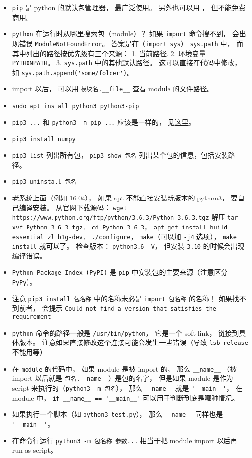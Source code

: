 

\begin{itemize}
\item \verb`pip` 是 python 的默认包管理器， 最广泛使用。 另外也可以用 ， 但不能免费商用。
\item \verb`python` 在运行时从哪里搜索包（module）？ 如果 \verb`import` 命令搜不到， 会出现错误 \verb`ModuleNotFoundError`。 答案是在（\verb`import sys`） \verb`sys.path` 中， 而其中列出的路径按优先级有三个来源： 1. 当前路径. 2. 环境变量 \verb`PYTHONPATH`。 3. \verb`sys.path` 中的其他默认路径。 这可以直接在代码中修改， 如 \verb`sys.path.append('some/folder')`。
\item import 以后， 可以用 \verb`模块名.__file__` 查看 module 的文件路径。
\item \verb`sudo apt install python3 python3-pip`
\item \verb`pip3 ...` 和 \verb`python3 -m pip ...` 应该是一样的， 见\href{https://stackoverflow.com/questions/41307101/difference-between-pip3-and-python3-m-pip}{这里}。
\item \verb`pip3 install numpy`
\item \verb`pip3 list` 列出所有包， \verb`pip3 show 包名` 列出某个包的信息，包括安装路径。
\item \verb`pip3 uninstall 包名`
\item 老系统上面（例如 16.04）， 如果 apt 不能直接安装新版本的 python3， 要自己编译安装。 从官网下载源码： \verb`wget https://www.python.org/ftp/python/3.6.3/Python-3.6.3.tgz` 解压 \verb`tar -xvf Python-3.6.3.tgz`， \verb`cd Python-3.6.3`， \verb`apt-get install build-essential zlib1g-dev`， \verb`./configure`， \verb`make`（可以加 \verb`-j4` 选项）， \verb`make install` 就可以了。 检查版本： \verb`python3.6 -V`， 但安装 \verb`3.10` 的时候会出现编译错误。
\item \verb`Python Package Index (PyPI)` 是 \verb`pip` 中安装包的主要来源（注意区分 \verb`PyPy`）。
\item 注意 \verb`pip3 install 包名称` 中的名称未必是 \verb`import 包名称` 的名称！ 如果找不到前者， 会提示 \verb`Could not find a version that satisfies the requirement`
\item \verb`python` 命令的路径一般是 \verb`/usr/bin/python`， 它是一个 soft link， 链接到具体版本。 注意如果直接修改这个连接可能会发生一些错误（导致 \verb`lsb_release` 不能用等）
\item 在 \verb`module` 的代码中， 如果 module 是被 import 的， 那么 \verb`__name__` （被 import 以后就是 \verb`包名.__name__`）是包的名字， 但是如果 module 是作为 script 来执行的（\verb`python3 -m 包名`）， 那么 \verb`__name__` 就是 \verb`'__main__'`， 在 module 中， \verb`if __name__ == '__main__'` 可以用于判断到底是哪种情况。
\item 如果执行一个脚本（如 \verb`python3 test.py`）， 那么 \verb`__name__` 同样也是 \verb`'__main__'`。
\item 在命令行运行 \verb`python3 -m 包名称 参数...` 相当于把 module import 以后再 run as script。
\end{itemize}
